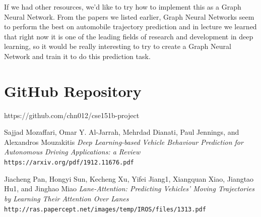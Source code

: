 \documentclass{article}
\begin{document}
If we had other resources, we'd like to try how to implement this as a Graph Neural Network. From the papers we listed earlier, Graph Neural Networks seem to perform the best on automobile trajectory prediction and in lecture we learned that right now it is one of the leading fields of research and development in deep learning, so it would be really interesting to try to create a Graph Neural Network and train it to do this prediction task. 
\section{GitHub Repository}
https://github.com/chn012/cse151b-project

\begin{thebibliography}{9}
Sajjad Mozaffari, Omar Y. Al-Jarrah, Mehrdad Dianati, Paul Jennings, and Alexandros Mouzakitis 
\textit{Deep Learning-based Vehicle Behaviour Prediction for Autonomous Driving Applications: a Review}
\\\texttt{https://arxiv.org/pdf/1912.11676.pdf}

Jiacheng Pan, Hongyi Sun, Kecheng Xu, Yifei Jiang1, Xiangquan Xiao, Jiangtao Hu1, and Jinghao Miao
\textit{Lane-Attention: Predicting Vehicles’ Moving Trajectories by Learning Their Attention Over Lanes}
\\\texttt{http://ras.papercept.net/images/temp/IROS/files/1313.pdf}
\end{thebibliography}
\end{document}

